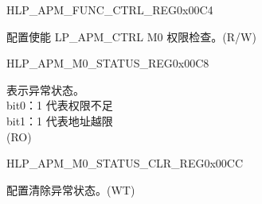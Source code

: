 \begin{register}{H}{LP\_APM\_FUNC\_CTRL\_REG}{0x00C4}\label{regdesc:LPAPMFUNCCTRLREG}
%
%
\regnewline%
\begin{regdesc}\begin{reglist}
\label{fielddesc:LPAPMM0FUNCEN}\item [LP\_APM\_M0\_FUNC\_EN] 配置使能 LP\_APM\_CTRL M0 权限检查。(R/W)
\end{reglist}\end{regdesc}
\end{register}


\begin{register}{H}{LP\_APM\_M0\_STATUS\_REG}{0x00C8}\label{regdesc:LPAPMM0STATUSREG}
%
%
\regnewline%
\begin{regdesc}\begin{reglist}
\label{fielddesc:LPAPMM0EXCEPTIONSTATUS}\item [LP\_APM\_M0\_EXCEPTION\_STATUS] 表示异常状态。\\ 
bit0：1 代表权限不足 \\
bit1：1 代表地址越限  \\ (RO)
\end{reglist}\end{regdesc}
\end{register}


\begin{register}{H}{LP\_APM\_M0\_STATUS\_CLR\_REG}{0x00CC}\label{regdesc:LPAPMM0STATUSCLRREG}
%
%
\regnewline%
\begin{regdesc}\begin{reglist}
\label{fielddesc:LPAPMM0EXCEPTIONSTATUSCLR}\item [LP\_APM\_M0\_EXCEPTION\_STATUS\_CLR] 配置清除异常状态。(WT)
\end{reglist}\end{regdesc}
\end{register}


